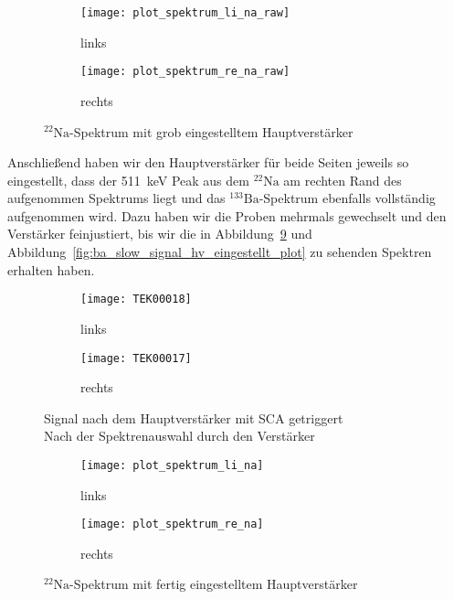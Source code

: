 \documentclass[11pt, ngerman, fleqn, DIV=15, headinclude, BCOR=2cm]{scrreprt}
\begin{document}
\begin{figure}
	\centering
	\begin{subfigure}{0.49 \textwidth}
		\texttt{[image: plot\_spektrum\_li\_na\_raw]}
		\caption{%
			links
		}
		\label{fig:slow_signal_sca_trig-li_plot}
	\end{subfigure}
	\begin{subfigure}{0.49 \textwidth}
		\texttt{[image: plot\_spektrum\_re\_na\_raw]}
		\caption{%
			rechts
		}
		\label{fig:slow_signal_sca_trig-re_plot}
	\end{subfigure}
	\caption{%
		$^{22}\text{Na}$-Spektrum mit grob eingestelltem
		Hauptverstärker
	}
	\label{fig:slow_signal_sca_trig_plot}
\end{figure}

Anschließend haben wir den Hauptverstärker für beide Seiten jeweils so
eingestellt, dass der \SI{511}{\kilo\electronvolt} Peak aus dem
$^{22}\text{Na}$ am rechten Rand des aufgenommen Spektrums liegt und das
$^{133}\text{Ba}$-Spektrum ebenfalls vollständig aufgenommen wird. Dazu haben
wir die Proben mehrmals gewechselt und den Verstärker feinjustiert, bis wir die
in Abbildung~\ref{fig:slow_signal_hv_eingestellt_plot} und
Abbildung~\ref{fig:ba_slow_signal_hv_eingestellt_plot} zu sehenden Spektren
erhalten haben.


\begin{figure}
	\centering
	\begin{subfigure}{0.49 \textwidth}
		\texttt{[image: TEK00018]}
		\caption{%
			links
		}
		\label{fig:slow_signal_hv_eingestellt-li}
	\end{subfigure}
	\begin{subfigure}{0.49 \textwidth}
		\texttt{[image: TEK00017]}
		\caption{%
			rechts
		}
		\label{fig:slow_signal_hv_eingestellt-re}
	\end{subfigure}
	\caption{%
		Signal nach dem Hauptverstärker mit SCA getriggert\\
		Nach der Spektrenauswahl durch den Verstärker
	}
	\label{fig:slow_signal_hv_eingestellt}
\end{figure}

\begin{figure}
	\centering
	\begin{subfigure}{0.49 \textwidth}
		\texttt{[image: plot\_spektrum\_li\_na]}
		\caption{%
			links
		}
		\label{fig:slow_hv_eingestellt-li_plot}
	\end{subfigure}
	\begin{subfigure}{0.49 \textwidth}
		\texttt{[image: plot\_spektrum\_re\_na]}
		\caption{%
			rechts
		}
		\label{fig:slow_hv_eingestellt-re_plot}
	\end{subfigure}
	\caption{%
		$^{22}\text{Na}$-Spektrum mit fertig eingestelltem
		Hauptverstärker
	}
	\label{fig:slow_signal_hv_eingestellt_plot}
\end{figure}
\end{document}
